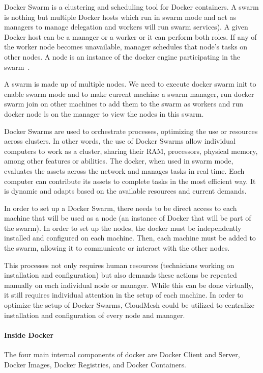 	Docker Swarm is a clustering and scheduling tool for Docker
  containers. A swarm is nothing but multiple Docker hosts
  which run in swarm mode and act as managers to manage
  delegation and workers will run swarm services). A given
  Docker host can be a manager or a worker or it can perform
  both roles. If any of the worker node becomes unavailable,
  manager schedules that node's tasks on other nodes. 
  A node is an instance of the docker engine participating 
  in the swarm~\cite{dockerdoc2017}.
	
	A swarm is made up of multiple nodes. We need to execute 
  docker swarm init to enable swarm mode and to make current 
  machine a swarm manager, run docker swarm join on other
  machines to add them to the swarm as workers and run 
  docker node ls on the manager to view the nodes in this swarm.
	
	Docker Swarms are used to orchestrate processes, optimizing
  the use or resources across clusters.  In other words, the
  use of Docker Swarms allow individual computers to work as
  a cluster, sharing their RAM, processors, physical memory,
  among other features or abilities.    
  The docker, when used in swarm mode, evaluates the assets
  across the network and manages tasks in real time. Each 
  computer can contribute its assets to complete tasks in the
  most efficient way. It is dynamic and adapts based on the
  available resources and current demands.   
	
	In order to set up a Docker Swarm, there needs to be direct
  access to each machine that will be used as a node (an instance
  of Docker that will be part of the swarm).  In order to set up
  the nodes, the docker must be independently installed and 
  configured on each machine.  Then, each machine must be added
  to the swarm, allowing it to communicate or interact with the
  other nodes.  
	
	This processes not only requires human resources (technicians 
  working on installation and configuration) but also demands 
  these actions be repeated manually on each individual node or
  manager. While this can be done virtually, it still requires
  individual attention in the setup of each machine.  In order 
  to optimize the setup of Docker Swarms, CloudMesh could be 
  utilized to centralize installation and configuration of every 
  node and manager.  
	
	
	\paragraph{Inside Docker}
	The four main internal components of docker are Docker Client
  and Server, Docker Images, Docker Registries, and Docker Containers.
